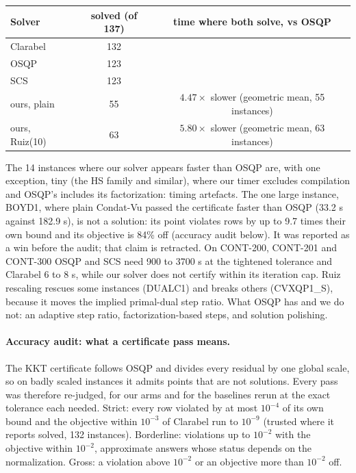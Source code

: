 \begin{center}
\small
\begin{tabular}{lcc}
\toprule
Solver & solved (of 137) & time where both solve, vs OSQP \\
\midrule
Clarabel & 132 & \\
OSQP & 123 & \\
SCS & 123 & \\
ours, plain & 55 & $4.47\times$ slower (geometric mean, 55 instances) \\
ours, Ruiz(10) & 63 & $5.80\times$ slower (geometric mean, 63 instances) \\
\bottomrule
\end{tabular}
\end{center}

The 14 instances where our solver appears faster than OSQP are, with one
exception, tiny (the HS family and similar), where our timer excludes
compilation and OSQP's includes its factorization: timing artefacts. The
one large instance, BOYD1, where plain Condat-Vu passed the certificate
faster than OSQP (33.2 s against 182.9 s), is not a solution: its point
violates rows by up to 9.7 times their own bound and its objective is 84\%
off (accuracy audit below). It was reported as a win before the audit; that
claim is retracted. On CONT-200, CONT-201 and
CONT-300 OSQP and SCS need 900 to 3700 s at the tightened tolerance and
Clarabel 6 to 8 s, while our solver does not certify within its iteration
cap. Ruiz rescaling rescues some
instances (DUALC1) and breaks others (CVXQP1\_S), because it moves the
implied primal-dual step ratio. What OSQP has and we do not: an adaptive step
ratio, factorization-based steps, and solution polishing.

\paragraph{Accuracy audit: what a certificate pass means.}
 The KKT certificate
follows OSQP and divides every residual by one global scale, so on badly
scaled instances it admits points that are not solutions. Every pass was
therefore re-judged, for our arms and for the baselines rerun at the exact
tolerance each needed. Strict: every row violated by at most $10^{-4}$ of its
own bound and the objective within $10^{-3}$ of Clarabel run to $10^{-9}$
(trusted where it reports solved, 132 instances). Borderline: violations up
to $10^{-2}$ with the objective within $10^{-2}$, approximate answers whose
status depends on the normalization. Gross: a violation above $10^{-2}$ or an
objective more than $10^{-2}$ off.

